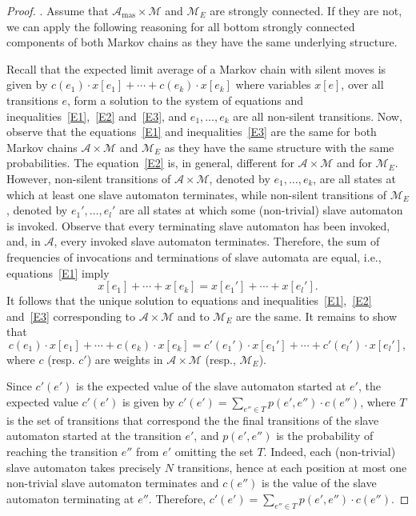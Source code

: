 \documentclass{lmcs}
\newcommand{\Paragraph}[1]{\noindent{\textbf{#1}}}
\newcommand{\masterA}{\mathcal{A}_{\textrm{mas}}}
\newcommand{\nonnestedA}{\mathcal{A}}
\newcommand{\markov}{\mathcal{M}}
\begin{document}
\begin{proof}
\Paragraph{Expected values of $\masterA \times \markov$ and $\markov_E$ coincide}.
Assume that $\masterA \times \markov$ and $\markov_E$ are strongly connected. If they are not,
we can apply the following reasoning for all bottom strongly connected components of both Markov chains as they have the same underlying structure.

Recall that the expected limit average of a Markov chain with silent moves is given by
$c(e_1) \cdot x[e_1] + \cdots + c(e_k) \cdot x[e_k]$ where
variables $x[e]$, over all transitions $e$, form a solution to the system of equations and inequalities~\ref{E1},~\ref{E2} and~\ref{E3}, and
$e_1, \ldots, e_k$ are all non-silent transitions.
Now, observe that the equations~\ref{E1} and inequalities~\ref{E3} are the same for both Markov chains
 $\nonnestedA \times \markov$ and  $\markov_E$ as they have the same structure with the same probabilities.
The equation~\ref{E2} is, in general, different for $\nonnestedA \times \markov$ and for $\markov_E$.
However, non-silent transitions of $\nonnestedA \times \markov$, denoted by $e_1, \ldots, e_k$,
are all states at which at least one slave automaton terminates, while
non-silent transitions of $\markov_E$, denoted by $e_1', \ldots, e_l'$ are all states at which some (non-trivial) slave automaton is invoked.
Observe that every terminating slave automaton has been invoked, and, in $\nonnestedA$,
every invoked slave automaton terminates. Therefore, the sum of frequencies of invocations
and terminations of slave automata are equal, i.e., equations~\ref{E1} imply
\[
x[e_1] + \cdots + x[e_k] = x[e_1']+ \cdots +x[e_l'].
\]
 It follows that the unique solution to equations and inequalities~\ref{E1},~\ref{E2} and~\ref{E3}
corresponding to $\nonnestedA \times \markov$ and to $\markov_E$ are the same.
It remains to show that
\[ c(e_1) \cdot x[e_1] + \cdots + c(e_k) \cdot x[e_k] =
 c'(e_1') \cdot x[e_1'] + \cdots + c'(e_l') \cdot x[e_l'],
\]
 where $c$ (resp. $c'$) are weights in  $\nonnestedA \times \markov$ (resp., $\markov_E$).

Since $c'(e')$ is the expected value of the slave automaton started at $e'$,
the expected value $c'(e')$ is given by $c'(e') = \sum_{e'' \in T} p(e',e'') \cdot c(e'')$, where
$T$ is the set of transitions that correspond the the final transitions of the slave automaton started at the transition $e'$, and
$p(e',e'')$ is the probability of reaching the transition $e''$ from $e'$ omitting the set $T$.
Indeed, each (non-trivial) slave automaton takes precisely $N$ transitions, hence
at each position at most one non-trivial slave automaton terminates and
$c(e'')$ is the value of the slave automaton terminating at $e''$.
Therefore, $c'(e') = \sum_{e'' \in T} p(e',e'') \cdot c(e'')$.


\end{proof}
\end{document}
